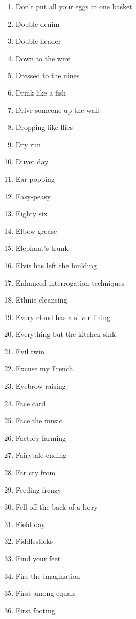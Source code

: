 \begin{enumerate}
        \item  Don't put all your eggs in one basket
        \item  Double denim
        \item  Double header
        \item  Down to the wire
        \item  Dressed to the nines
        \item  Drink like a fish
        \item  Drive someone up the wall
        \item  Dropping like flies
        \item  Dry run
        \item  Duvet day
        \item  Ear popping
        \item  Easy-peasy
        \item  Eighty six
        \item  Elbow grease
        \item  Elephant's trunk
        \item  Elvis has left the building
        \item  Enhanced interrogation techniques
        \item  Ethnic cleansing
        \item  Every cloud has a silver lining
        \item  Everything but the kitchen sink
        \item  Evil twin
        \item  Excuse my French
        \item  Eyebrow raising
        \item  Face card
        \item  Face the music
        \item  Factory farming
        \item  Fairytale ending
        \item  Far cry from
        \item  Feeding frenzy
        \item  Fell off the back of a lorry
        \item  Field day
        \item  Fiddlesticks
        \item  Find your feet
        \item  Fire the imagination
        \item  First among equals
        \item  First footing

\end{enumerate}
